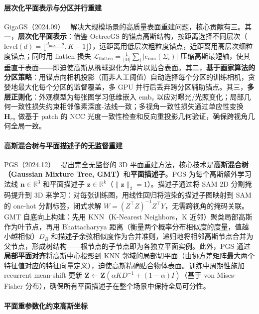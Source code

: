 \paragraph{层次化平面表示与分区并行重建}

GigaGS（2024.09）~\cite{2409_06685} 解决大规模场景的高质量表面重建问题，核心贡献有三。其一，\textbf{层次化平面表示}：借鉴 OctreeGS 的锚点高斯结构，按距离选择不同层次（$\text{level}(d) = \lfloor \frac{d_\text{max} - d}{\cdot}, K\!-\!1 \rfloor$），远距离用低层次粗粒度锚点，近距离用高层次细粒度锚点；同时用 flatten 损失 $\mathcal{L}_\text{flatten} = \frac{1}{|M|}\sum_i |e_\text{min}(\Sigma_i)|$ 压缩高斯最短轴，使其垂直于表面——即迫使高斯从椭球退化为薄片以贴合表面。其二，\textbf{基于画家算法的分区策略}：用锚点向相机投影（而非人工阈值）自动选择每个分区的训练相机，贪婪地最大化每个分区的监督覆盖，多 GPU 并行后丢弃跨分区辅助锚点。其三，\textbf{多层正则化}：外观模型为每张图学习低维嵌入 $\text{emb}_v$ 以应对曝光/光照变化；局部几何一致性损失约束相邻像素深度-法线一致；多视角一致性损失通过单应性变换 $\mathbf{H}_{rn}$ 做基于 patch 的 NCC 光度一致性检查和反向重投影几何验证，确保跨视角几何全局一致。

\paragraph{高斯混合树与平面描述子的无监督重建}

PGS（2024.12）~\cite{2412_01931} 提出完全无监督的 3D 平面重建方法，核心技术是\textbf{高斯混合树（Gaussian Mixture Tree, GMT）}和\textbf{平面描述子}。PGS 为每个高斯额外学习法线 $\mathbf{n} \in \mathbb{R}^3$ 和平面描述子 $\mathbf{z} \in \mathbb{R}^k$（$\|\mathbf{z}\|_2 = 1$）。描述子通过将 SAM 2D 分割掩码提升到 3D 来学习：对每张训练图，用线性回归将渲染的描述子图映射到 SAM 的 one-hot 分割标签，闭式求解 $W = (Z^\top Z)^{-1} Z^\top Y$，无需跨视角的掩码关联。GMT 自底向上构建：先用 KNN（K-Nearest Neighbors，K 近邻）聚类局部高斯作为叶节点，再用 Bhattacharyya 距离（衡量两个概率分布相似度的度量，值越小越相似）$D_B$ 和描述子余弦相似度作为合并准则，递归地将相邻高斯节点合并为父节点，形成树结构——根节点的子节点即为各独立平面实例。此外，PGS 通过\textbf{局部平面对齐}将高斯中心投影到 KNN 邻域的局部切平面（由协方差矩阵最大两个特征值对应的特征向量定义），迫使高斯精确贴合物体表面。训练中周期性施加 recurrent mean-shift 更新 $\mathbf{Z} \leftarrow \mathbf{Z}(\alpha K D^{-1} + (1-\alpha) I)$（基于 von Mises-Fisher 分布），确保所有平面描述子在整个场景中保持全局可分性。

\paragraph{平面重参数化约束高斯坐标}

